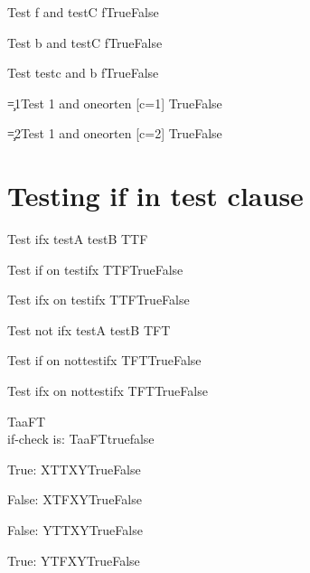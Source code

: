 \documentclass{article}
\begin{document}
Test f and testC \if f\testC True\else False\fi

Test b and testC \if f\testC True\else False\fi

Test testc and b  \if f\testC True\else False\fi

\c=1\relax Test 1 and oneorten [c=1]  \oneorten True\else False\fi

\c=2\relax Test 1 and oneorten [c=2]  \oneorten True\else False\fi

\section{Testing if in test clause}
\def\testifx{T\ifx\testA\testB T\else F\fi}

Test ifx testA testB \testifx

Test if on testifx \if\testifx True\else False\fi

Test ifx on testifx \if\testifx True\else False\fi

\def\nottestifx{T\ifx\testA\testB F\else T\fi}

Test not ifx testA testB \nottestifx

Test if on nottestifx \if\nottestifx True\else False\fi

Test ifx on nottestifx \ifx\nottestifx True\else False\fi


\def\a{a}%
 \let\b=\a
 \def\check{T\ifx\a\b F\else T\fi}

 \check\\

 if-check is: \if\check true\else false\fi


\def\innerif{\if\clause X\else Y\fi}

True: \def\clause{TT}\if X\innerif True\else False\fi

False: \def\clause{TF}\if X\innerif True\else False\fi

False: \def\clause{TT}\if Y\innerif True\else False\fi

True: \def\clause{TF}\if Y\innerif True\else False\fi
\end{document}
